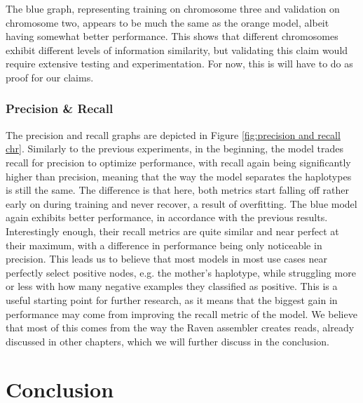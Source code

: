 \documentclass[times, utf8, diplomski, english]{fer_eng}
\begin{document}
The blue graph, representing training on chromosome three and validation on chromosome two, appears to be much the same as the orange model, albeit having somewhat better performance. This shows that different chromosomes exhibit different levels of information similarity, but validating this claim would require extensive testing and experimentation. For now, this is will have to do as proof for our claims.

\subsection{Precision \& Recall}
\label{subsec:precision and recall chr}

The precision and recall graphs are depicted in Figure \ref{fig:precision and recall chr}. Similarly to the previous experiments, in the beginning, the model trades recall for precision to optimize performance, with recall again being significantly higher than precision, meaning that the way the model separates the haplotypes is still the same. The difference is that here, both metrics start falling off rather early on during training and never recover, a result of overfitting. The blue model again exhibits better performance, in accordance with the previous results. Interestingly enough, their recall metrics are quite similar and near perfect at their maximum, with a difference in performance being only noticeable in precision. This leads us to believe that most models in most use cases near perfectly select positive nodes, e.g. the mother's haplotype, while struggling more or less with how many negative examples they classified as positive. This is a useful starting point for further research, as it means that the biggest gain in performance may come from improving the recall metric of the model. We believe that most of this comes from the way the Raven assembler creates reads, already discussed in other chapters, which we will further discuss in the conclusion.	

\chapter{Conclusion}
\label{ch:conclusion}
\end{document}
